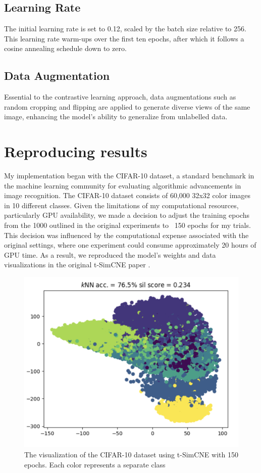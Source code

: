\subsection{Learning Rate}
The initial learning rate is set to 0.12, scaled by the batch size relative to 256. This learning rate warm-ups over the first ten epochs, after which it follows a cosine annealing schedule down to zero. 

\subsection{Data Augmentation}
Essential to the contrastive learning approach, data augmentations such as random cropping and flipping are applied to generate diverse views of the same image, enhancing the model's ability to generalize from unlabelled data.

\section{Reproducing results}

My implementation began with the CIFAR-10 dataset, a standard benchmark in the machine learning community for evaluating algorithmic advancements in image recognition. The CIFAR-10 dataset consists of 60,000 32x32 color images in 10 different classes. Given the limitations of my computational resources, particularly GPU availability, we made a decision to adjust the training epochs from the 1000 outlined in the original experiments to ~150 epochs for my trials. This decision was influenced by the computational expense associated with the original settings, where one experiment could consume approximately 20 hours of GPU time. As a result, we reproduced the model's weights and data visualizations in the original t-SimCNE paper \cite{tsimcne}.

\begin{figure}[hbt]
\centering
\includegraphics[width=\textwidth]{figs/cifar-10-tsimcne-2.png}
\caption{The visualization of the CIFAR-10 dataset using t-SimCNE with 150 epochs. Each color represents a separate class}
\label{fig:secex}
\end{figure}

